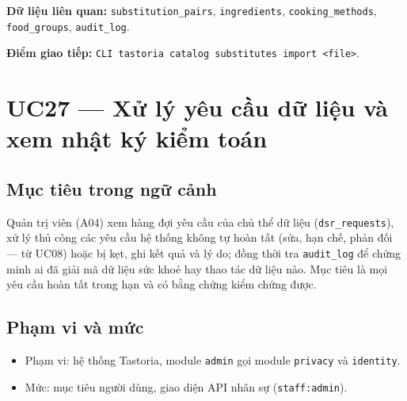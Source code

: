 \textbf{Dữ liệu liên quan:} {\small\texttt{substitution\_\allowbreak{}\allowbreak{}pairs}}, {\small\texttt{ingredients}}, {\small\texttt{cooking\_\allowbreak{}\allowbreak{}methods}}, {\small\texttt{food\_\allowbreak{}\allowbreak{}groups}}, {\small\texttt{audit\_\allowbreak{}\allowbreak{}log}}.

\textbf{Điểm giao tiếp:} {\small\texttt{CLI tastoria catalog substitutes import <file>}}.

\section{UC27 --- Xử lý yêu cầu dữ liệu và xem nhật ký kiểm toán}
\subsection{Mục tiêu trong ngữ cảnh}
Quản trị viên (A04) xem hàng đợi yêu cầu của chủ thể dữ liệu ({\small\texttt{dsr\_\allowbreak{}\allowbreak{}requests}}), xử lý thủ công các yêu cầu hệ thống không tự hoàn tất (sửa, hạn chế, phản đối --- từ UC08) hoặc bị kẹt, ghi kết quả và lý do; đồng thời tra {\small\texttt{audit\_\allowbreak{}\allowbreak{}log}} để chứng minh ai đã giải mã dữ liệu sức khoẻ hay thao tác dữ liệu nào. Mục tiêu là mọi yêu cầu hoàn tất trong hạn và có bằng chứng kiểm chứng được.

\subsection{Phạm vi và mức}
\begin{itemize}
\item Phạm vi: hệ thống Tastoria, module {\small\texttt{admin}} gọi module {\small\texttt{privacy}} và {\small\texttt{identity}}.
\item Mức: mục tiêu người dùng, giao diện API nhân sự ({\small\texttt{staff:admin}}).
\end{itemize}
